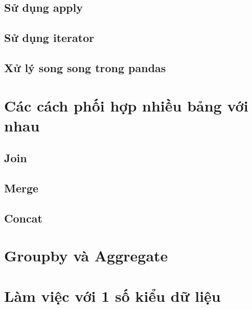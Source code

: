 \documentclass[
]{book}
\begin{document}
\hypertarget{sux1eed-dux1ee5ng-apply}{%
\section{Sử dụng apply}\label{sux1eed-dux1ee5ng-apply}}

\hypertarget{sux1eed-dux1ee5ng-iterator}{%
\section{Sử dụng iterator}\label{sux1eed-dux1ee5ng-iterator}}

\hypertarget{xux1eed-luxfd-song-song-trong-pandas}{%
\section{Xử lý song song trong pandas}\label{xux1eed-luxfd-song-song-trong-pandas}}

\hypertarget{cuxe1c-cuxe1ch-phux1ed1i-hux1ee3p-nhiux1ec1u-bux1ea3ng-vux1edbi-nhau}{%
\chapter{Các cách phối hợp nhiều bảng với nhau}\label{cuxe1c-cuxe1ch-phux1ed1i-hux1ee3p-nhiux1ec1u-bux1ea3ng-vux1edbi-nhau}}

\hypertarget{join}{%
\section{Join}\label{join}}

\hypertarget{merge}{%
\section{Merge}\label{merge}}

\hypertarget{concat}{%
\section{Concat}\label{concat}}

\hypertarget{groupby-vuxe0-aggregate}{%
\chapter{Groupby và Aggregate}\label{groupby-vuxe0-aggregate}}

\hypertarget{luxe0m-viux1ec7c-vux1edbi-1-sux1ed1-kiux1ec3u-dux1eef-liux1ec7u}{%
\chapter{Làm việc với 1 số kiểu dữ liệu}\label{luxe0m-viux1ec7c-vux1edbi-1-sux1ed1-kiux1ec3u-dux1eef-liux1ec7u}}
\end{document}
